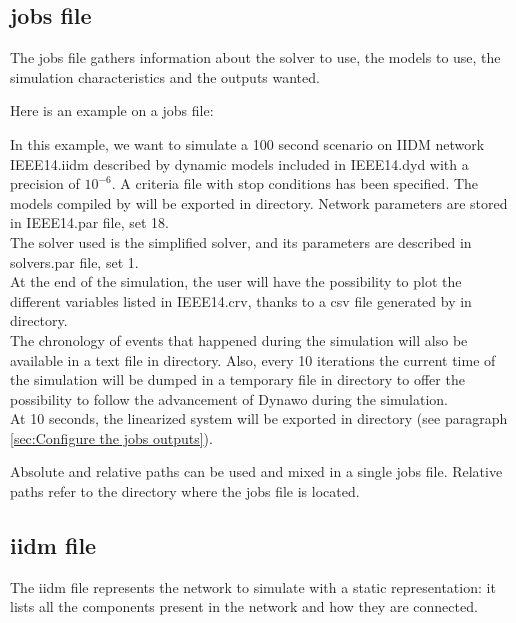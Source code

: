 \documentclass[a4paper, 12pt]{report}
\begin{document}
\subsection{jobs file}

The jobs file gathers information about the solver to use, the models to use, the simulation characteristics and the outputs wanted.

Here is an example on a jobs file:


In this example, we want to simulate a 100 second scenario on IIDM network
IEEE14.iidm described by dynamic models included in IEEE14.dyd with a precision
of $10^{-6}$. A criteria file with stop conditions has been specified.
The models compiled by \Dynawo will be exported in  directory. Network parameters are stored in IEEE14.par file, set 18. \\

The solver used is the simplified solver, and its parameters are described in solvers.par file, set 1. \\

At the end of the simulation, the user will have the possibility to plot the different variables listed in IEEE14.crv, thanks to a csv file generated by \Dynawo in  directory. \\

The chronology of events that happened during the simulation will also be
available in a text file in  directory. Also, every 10
iterations the current time of the simulation will be dumped in a
temporary file in  directory to offer the possibility to follow the advancement of Dynawo during the simulation. \\

At 10 seconds, the linearized system will be exported in  directory (see paragraph \ref{sec:Configure the jobs outputs}).

Absolute and relative paths can be used and mixed in a single jobs file. Relative paths refer to the directory where the jobs file is located.

\subsection{iidm file}

The iidm file represents the network to simulate with a static representation: it lists all the components present in the network and how they are connected. \\
\end{document}
